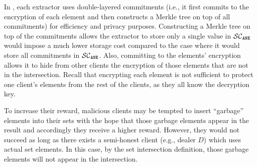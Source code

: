 %







In \epsi, each extractor uses double-layered commitments (i.e., it first commits to the encryption of each element and then constructs a Merkle tree on top of all commitments) for efficiency and privacy purposes. Constructing a Merkle tree on top of the commitments allows the extractor to store only a single value in $\mathcal{SC}_{\mathtt{ANE}}$ would impose a much lower storage cost compared to the case where it would store all commitments in $\mathcal{SC}_{\mathtt{ANE}}$. Also, committing to the elements' encryption allows it to hide from other clients the encryption of those elements that are not in the intersection. Recall that encrypting each element is not sufficient to protect one client's elements from the rest of the clients, as they all know the decryption key. 


To increase their reward, malicious clients may be tempted to insert ``garbage'' elements into their sets with the hope that those garbage elements appear in the result and accordingly they receive a higher reward. However, they would not succeed as long as there exists a semi-honest client (e.g., dealer $D$) which uses actual set elements. In this case, by the set intersection definition, those garbage elements will not appear in the intersection. 

